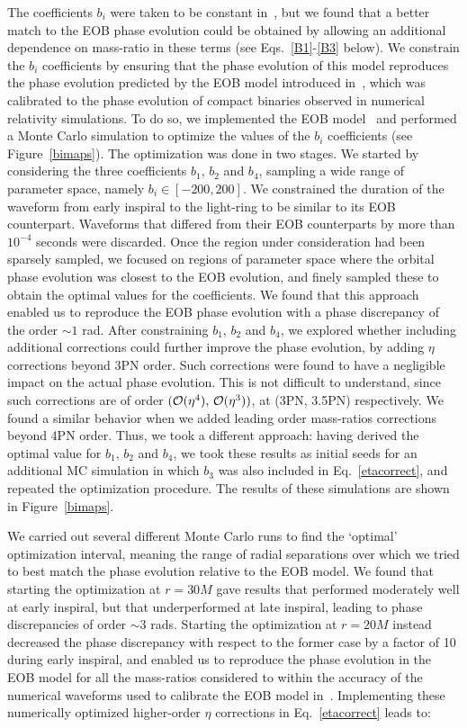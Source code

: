 \documentclass[aps,prd,showpacs,amssymb,floatfix,nofootinbib,superscriptaddress]{revtex4-1}%
\begin{document}
\noindent  The coefficients \(b_i\) were taken to be constant in~\cite{Isoyama:2013}, but we found that a better match to the EOB phase evolution could be obtained by allowing an additional dependence on mass-ratio in these terms (see Eqs.~\eqref{B1}-\eqref{B3} below).  We constrain the \(b_i\) coefficients by ensuring that the phase evolution of this model reproduces the phase evolution predicted by the EOB model introduced in~\cite{buho, Damour:2013}, which was calibrated to the phase evolution of compact binaries observed in numerical relativity simulations. To do so, we implemented the EOB model~\cite{buho} and performed a Monte Carlo simulation to optimize the values of the \(b_i\) coefficients (see Figure~\ref{bimaps}). The optimization was done in two stages. We started by considering the three coefficients \(b_1,\, b_2\) and \(b_4\),  sampling a wide range of parameter space, namely \(b_i\in[-200,200]\). We constrained the duration of the waveform from early inspiral to the light-ring to be similar to its EOB counterpart. Waveforms that differed from their EOB counterparts by more than \(10^{-4}\) seconds were discarded.  Once the region under consideration had been sparsely sampled, we focused on regions of parameter space where the orbital phase evolution was closest to the EOB evolution, and finely sampled these to obtain the optimal values for the coefficients. We found that this approach enabled us to reproduce the EOB phase evolution with a phase discrepancy of the order \(\sim 1\) rad. After constraining \(b_1,\, b_2\) and \(b_4\), we explored whether including additional corrections could further improve the phase evolution, by adding \(\eta\) corrections beyond 3PN order. Such corrections were found to have a negligible impact on the actual phase evolution. This is not difficult to understand, since such corrections are of order \(({\cal{O}}(\eta^4),\, {\cal{O}}(\eta^3))\), at (3PN, 3.5PN) respectively.  We found a similar behavior when we added leading order mass-ratios corrections beyond 4PN order. Thus, we took a different approach: having derived the optimal value for \(b_1,\, b_2\) and \(b_4\), we took these results as initial seeds for an additional MC simulation in which \(b_3\) was also included in Eq.~\eqref{etacorrect}, and repeated the optimization procedure. The results of these simulations are shown in Figure~\ref{bimaps}.

We carried out several different Monte Carlo runs to find the `optimal' optimization interval, meaning the range of radial separations over which we tried to best match the phase evolution relative to the EOB model. We found that starting the optimization at \(r=30M\) gave results that performed moderately well at early inspiral, but that underperformed at late inspiral, leading to phase discrepancies of order \(\sim 3\) rads. Starting the optimization at \(r=20M\) instead decreased the phase discrepancy with respect to the former case by a factor of 10 during early inspiral, and enabled us to reproduce the phase evolution in the EOB model for all the mass-ratios considered to within the accuracy of the numerical waveforms used to calibrate the EOB model in~\cite{buho, Damour:2013}. Implementing these numerically optimized higher-order \(\eta\) corrections in Eq.~\eqref{etacorrect} leads to:
\end{document}
